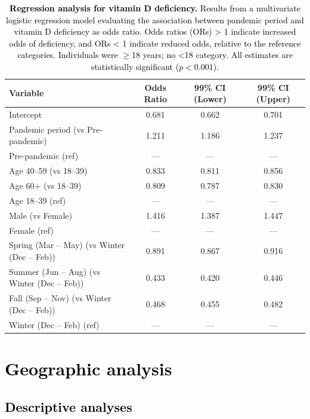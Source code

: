 \documentclass[12pt]{article}
\newcommand{\REV}[1]{\textcolor{black}{#1}}
\begin{document}
\begin{appendices}
\newpage
\begin{table}[H]
\centering
{}
\caption[Regression analysis for vitamin D deficiency]{\REV{\textbf{Regression analysis for vitamin D deficiency.} Results from a multivariate logistic regression model evaluating the association between pandemic period and vitamin D deficiency as odds ratio. Odds ratios (ORs) > 1 indicate increased odds of deficiency, and ORs < 1 indicate reduced odds, relative to the reference categories. Individuals were $\geq$18 years; no <18 category. All estimates are statistically significant ($p < 0.001$).}}
\label{supptab:logistic_regression}
\footnotesize
\begin{tabular}{|l|c|c|c|}
\hline
\rowcolor{orange!20} \textbf{Variable} & \textbf{Odds Ratio} & \textbf{99\% CI (Lower)} & \textbf{99\% CI (Upper)} \\ \hline
Intercept & 0.681 & 0.662 & 0.701 \\ \hline
Pandemic period (vs Pre-pandemic) & 1.211 & 1.186 & 1.237 \\ \hline
Pre-pandemic (ref) & --- & --- & --- \\ \hline
Age 40--59 (vs 18--39) & 0.833 & 0.811 & 0.856 \\ \hline
Age 60+ (vs 18--39) & 0.809 & 0.787 & 0.830 \\ \hline
Age 18--39 (ref) & --- & --- & --- \\ \hline
Male (vs Female) & 1.416 & 1.387 & 1.447 \\ \hline
Female (ref) & --- & --- & --- \\ \hline
Spring (Mar -- May) (vs Winter (Dec -- Feb)) & 0.891 & 0.867 & 0.916 \\ \hline
Summer (Jun -- Aug) (vs Winter (Dec -- Feb)) & 0.433 & 0.420 & 0.446 \\ \hline
Fall (Sep -- Nov) (vs Winter (Dec -- Feb)) & 0.468 & 0.455 & 0.482 \\ \hline
Winter (Dec -- Feb) (ref) & --- & --- & --- \\ \hline
\end{tabular}
\end{table}

\newpage
\section{\REV{Geographic analysis}}
\label{supp:geographic_analysis}

\subsection{\REV{Descriptive analyses}}


\end{appendices}
\end{document}
